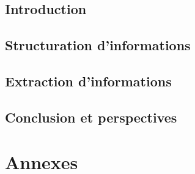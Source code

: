 \chapter{Introduction}
\minitoc


\chapter{Structuration d'informations}
\minitoc


\chapter{Extraction d'informations}
\minitoc



\chapter{Conclusion et perspectives}


\cleardoublepage    %
\appendix
\part{Annexes}

\clearpage
\backmatter


\printglossary
{}
\printglossary[type=acronym]
